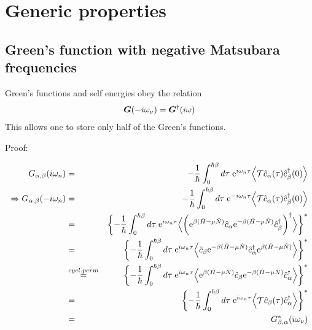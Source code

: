 \documentclass[11pt,a4paper]{report}
\begin{document}
\section{Generic properties}
\subsection{Green's function with negative Matsubara frequencies}
Green's functions and self energies obey the relation
\begin{eqnarray}
\bm{G}(-i\omega_\nu)=\bm{G}^\dagger(i\omega)
\label{eq:matsubaragnegfreq}
\end{eqnarray}
This allows one to store only half of the Green's functions.

Proof:

\begin{eqnarray}
G_{\alpha,\beta}(i\omega_n)&=&
-\frac{1}{\hbar}\int_0^{\hbar\beta} d\tau\;\mathrm{e}^{i\omega_n\tau}
\Bigl\langle\mathcal{T}\hat{c}_\alpha(\tau)\hat{c}^\dagger_\beta(0)\Bigr\rangle
\\
\Rightarrow
G_{\alpha,\beta}(-i\omega_n)
&=&
-\frac{1}{\hbar}\int_0^{\hbar\beta} d\tau\;\mathrm{e}^{-i\omega_n\tau}
\Bigl\langle\mathcal{T}\hat{c}_\alpha(\tau)\hat{c}^\dagger_\beta(0)\Bigr\rangle
\nonumber\\
&=&
\biggl\lbrace
-\frac{1}{\hbar}\int_0^{\hbar\beta} d\tau\;\mathrm{e}^{i\omega_n\tau}
\Bigl\langle\biggl(\mathrm{e}^{\beta(\hat{H}-\mu\hat{N})}\hat{c}_\alpha
\mathrm{e}^{-\beta(\hat{H}-\mu\hat{N})}\hat{c}^\dagger_\beta\biggr)^\dagger
\Bigr\rangle
\biggr\rbrace^*
\nonumber\\
&=&
\biggl\lbrace
-\frac{1}{\hbar}\int_0^{\hbar\beta} d\tau\;\mathrm{e}^{i\omega_n\tau}
\Bigl\langle
\hat{c}_\beta\mathrm{e}^{-\beta(\hat{H}-\mu\hat{N})}\hat{c}^\dagger_\alpha
\mathrm{e}^{\beta(\hat{H}-\mu\hat{N})}
\Bigr\rangle
\biggr\rbrace^*
\nonumber\\
&\stackrel{cycl. perm}{=}&
\biggl\lbrace
-\frac{1}{\hbar}\int_0^{\hbar\beta} d\tau\;\mathrm{e}^{i\omega_n\tau}
\Bigl\langle
\mathrm{e}^{\beta(\hat{H}-\mu\hat{N})}
\hat{c}_\beta\mathrm{e}^{-\beta(\hat{H}-\mu\hat{N})}\hat{c}^\dagger_\alpha
\Bigr\rangle
\biggr\rbrace^*
\nonumber\\
&=&
\biggl\lbrace
-\frac{1}{\hbar}\int_0^{\hbar\beta} d\tau\;\mathrm{e}^{i\omega_n\tau}
\Bigl\langle
\mathcal{T}\hat{c}_\beta(\tau)\hat{c}^\dagger_\alpha
\Bigr\rangle
\biggr\rbrace^*
\nonumber\\
&=&
G_{\beta,\alpha}^*(i\omega_\nu)
\end{eqnarray}
\end{document}
